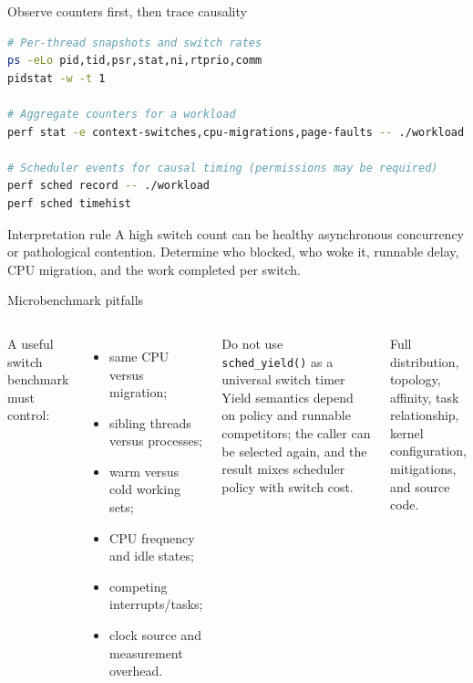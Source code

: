 \documentclass[aspectratio=169,11pt]{beamer}
\newcommand{\code}[1]{\texttt{#1}}
\begin{document}
\begin{frame}[fragile]{Observe counters first, then trace causality}
\begin{lstlisting}[language=bash]
# Per-thread snapshots and switch rates
ps -eLo pid,tid,psr,stat,ni,rtprio,comm
pidstat -w -t 1

# Aggregate counters for a workload
perf stat -e context-switches,cpu-migrations,page-faults -- ./workload

# Scheduler events for causal timing (permissions may be required)
perf sched record -- ./workload
perf sched timehist
\end{lstlisting}
  \begin{alertblock}{Interpretation rule}
    A high switch count can be healthy asynchronous concurrency or pathological contention. Determine who blocked, who woke it, runnable delay, CPU migration, and the work completed per switch.
  \end{alertblock}
\end{frame}

\begin{frame}{Microbenchmark pitfalls}
  \begin{columns}[T,onlytextwidth]
      A useful switch benchmark must control:
      \begin{itemize}
        \item same CPU versus migration;
        \item sibling threads versus processes;
        \item warm versus cold working sets;
        \item CPU frequency and idle states;
        \item competing interrupts/tasks;
        \item clock source and measurement overhead.
      \end{itemize}
      \begin{alertblock}{Do not use \code{sched\_yield()} as a universal switch timer}
        Yield semantics depend on policy and runnable competitors; the caller can be selected again, and the result mixes scheduler policy with switch cost.
      \end{alertblock}
      \begin{tcolorbox}[title=Report]
        Full distribution, topology, affinity, task relationship, kernel configuration, mitigations, and source code.
      \end{tcolorbox}
  \end{columns}
\end{frame}
\end{document}
